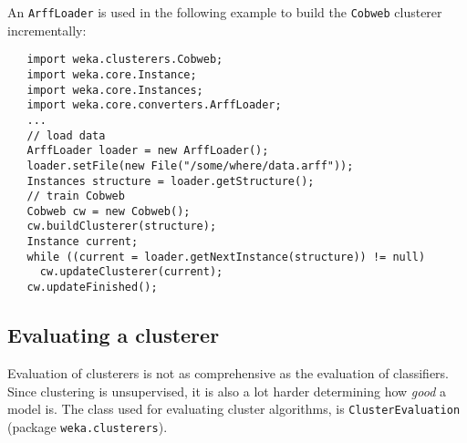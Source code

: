 \newpage

An \texttt{ArffLoader} is used in the following example to build the
\texttt{Cobweb} clusterer incrementally:
\begin{verbatim}
   import weka.clusterers.Cobweb;
   import weka.core.Instance;
   import weka.core.Instances;
   import weka.core.converters.ArffLoader;
   ...
   // load data
   ArffLoader loader = new ArffLoader();
   loader.setFile(new File("/some/where/data.arff"));
   Instances structure = loader.getStructure();
   // train Cobweb
   Cobweb cw = new Cobweb();
   cw.buildClusterer(structure);
   Instance current;
   while ((current = loader.getNextInstance(structure)) != null)
     cw.updateClusterer(current);
   cw.updateFinished();
\end{verbatim}

\newpage

\subsection{Evaluating a clusterer}
Evaluation of clusterers is not as comprehensive as the evaluation of
classifiers. Since clustering is unsupervised, it is also a lot harder
determining how \textit{good} a model is. The class used for evaluating cluster
algorithms, is \texttt{ClusterEvaluation} (package \texttt{weka.clusterers}).

